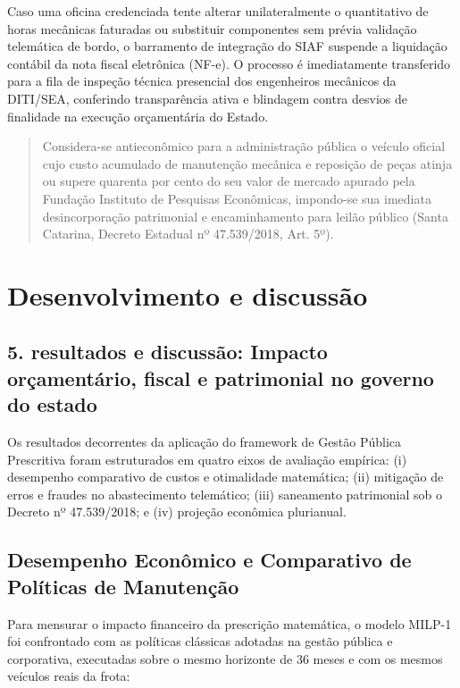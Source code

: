 \documentclass[12pt,a4paper]{article}
\begin{document}
Caso uma oficina credenciada tente alterar unilateralmente o quantitativo de horas mecânicas faturadas ou substituir componentes sem prévia validação telemática de bordo, o barramento de integração do SIAF suspende a liquidação contábil da nota fiscal eletrônica (NF-e). O processo é imediatamente transferido para a fila de inspeção técnica presencial dos engenheiros mecânicos da DITI/SEA, conferindo transparência ativa e blindagem contra desvios de finalidade na execução orçamentária do Estado.

\begin{quote}
\small Considera-se antieconômico para a administração pública o veículo oficial cujo custo acumulado de manutenção mecânica e reposição de peças atinja ou supere quarenta por cento do seu valor de mercado apurado pela Fundação Instituto de Pesquisas Econômicas, impondo-se sua imediata desincorporação patrimonial e encaminhamento para leilão público (Santa Catarina, Decreto Estadual nº 47.539/2018, Art. 5º).
\end{quote}


\section{Desenvolvimento e discussão}


\subsection{5. resultados e discussão: Impacto orçamentário, fiscal e patrimonial no governo do estado}

Os resultados decorrentes da aplicação do framework de Gestão Pública Prescritiva foram estruturados em quatro eixos de avaliação empírica: (i) desempenho comparativo de custos e otimalidade matemática; (ii) mitigação de erros e fraudes no abastecimento telemático; (iii) saneamento patrimonial sob o Decreto nº 47.539/2018; e (iv) projeção econômica plurianual.


\subsection{Desempenho Econômico e Comparativo de Políticas de Manutenção}

Para mensurar o impacto financeiro da prescrição matemática, o modelo MILP-1 foi confrontado com as políticas clássicas adotadas na gestão pública e corporativa, executadas sobre o mesmo horizonte de 36 meses e com os mesmos veículos reais da frota:
\end{document}
